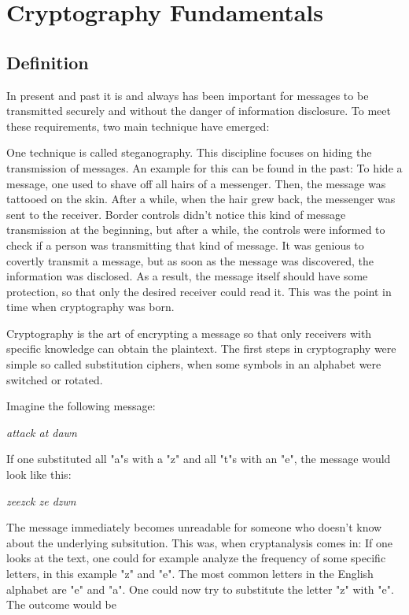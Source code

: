 \chapter{Cryptography Fundamentals}

\section{Definition}

In present and past it is and always has been important for messages to be
transmitted securely and without the danger of information disclosure.  To meet
these requirements, two main technique have emerged:

One technique is called steganography. This discipline focuses on hiding the
transmission of messages. An example for this can be found in the past: To hide
a message, one used to shave off all hairs of a messenger. Then, the message
was tattooed on the skin. After a while, when the hair grew back, the messenger
was sent to the receiver. Border controls didn't notice this kind of message
transmission at the beginning, but after a while, the controls were informed to
check if a person was transmitting that kind of message. It was genious to
covertly transmit a message, but as soon as the message was discovered, the
information was disclosed. As a result, the message itself should have some
protection, so that only the desired receiver could read it. This was the point
in time when cryptography was born.

Cryptography is the art of encrypting a message so that only receivers with
specific knowledge can obtain the plaintext. The first steps in cryptography
were simple so called substitution ciphers, when some symbols in an alphabet
were switched or rotated.

Imagine the following message:

\vspace{0.5cm}
\textit{attack at dawn}
\vspace{0.5cm}

If one substituted all "a"s with a "z" and all "t"s with an "e", the message
would look like this:

\vspace{0.5cm}
\textit{zeezck ze dzwn}
\vspace{0.5cm}

The message immediately becomes unreadable for someone who doesn't know about
the underlying subsitution. This was, when cryptanalysis comes in: If one looks
at the text, one could for example analyze the frequency of some specific
letters, in this example "z" and "e". The most common letters in the English
alphabet are "e" and "a". One could now try to substitute the letter "z" with
"e". The outcome would be

